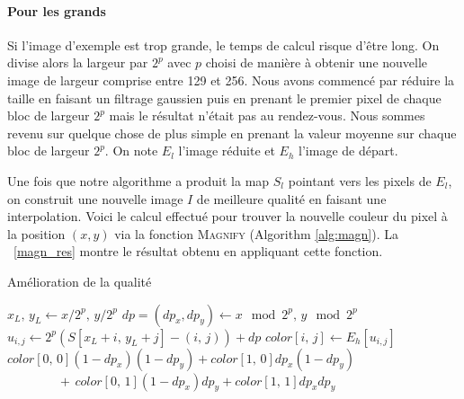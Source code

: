 \documentclass[12pt]{article}
\begin{document}
\paragraph{Pour les grands}

Si l'image d'exemple est trop grande, le temps de calcul risque d'être long. On divise alors la largeur par $2^p$ avec $p$ choisi de manière à obtenir une nouvelle image de largeur comprise entre 129 et 256. Nous avons commencé par réduire la taille en faisant un filtrage gaussien puis en prenant le premier pixel de chaque bloc de largeur $2^p$ mais le résultat n'était pas au rendez-vous. Nous sommes revenu sur quelque chose de plus simple en prenant la valeur moyenne sur chaque bloc de largeur $2^p$. On note $E_l$ l'image réduite et $E_h$ l'image de départ.

Une fois que notre algorithme a produit la map $S_l$ pointant vers les pixels de $E_l$, on construit une nouvelle image $I$ de meilleure qualité en faisant une interpolation. Voici le calcul effectué pour trouver la nouvelle couleur du pixel à la position $(x, y)$ via la fonction \textsc{Magnify} (Algorithm \ref{alg:magn}). La \figurename~\ref{magn_res} montre le résultat obtenu en appliquant cette fonction.

\begin{algorithm}
	\caption{Amélioration de la qualité}
	\label{alg:magn}
	\begin{algorithmic}
			\State $x_L, \, y_L \gets x / 2^p, \, y / 2^p$
			\State $dp = (dp_x, dp_y) \gets x \mod 2^p, \, y \mod 2^p$
				\State $u_{i, j} \gets 2^p \left( S \left[ x_L + i, \, y_L + j \right] - \left( i, \, j \right) \right) + dp$
				\State $color \left[ i, \, j \right] \gets E_h \left[ u_{i, j} \right]$
			\EndFor
			\State \Return $color \left[ 0, \, 0 \right] (1 - dp_x) (1 - dp_y)
						+ color \left[ 1, \, 0 \right] dp_x (1 - dp_y)$
			\State $\qquad \qquad + \, color \left[ 0, \, 1 \right] (1 - dp_x) dp_y
						+ color \left[ 1, \, 1 \right] dp_x dp_y$
		\EndFunction
	\end{algorithmic}
\end{algorithm}
\end{document}
